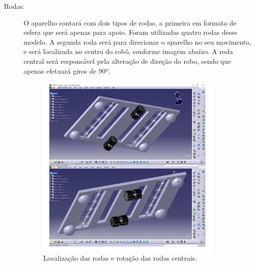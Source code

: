 \begin{description}
\item[Rodas:] O aparelho contará com dois tipos de rodas, a primeira em formato
de esfera que será apenas para apoio. Foram utilizadas quatro rodas desse modelo.
A segunda roda será para direcionar o aparelho no seu movimento, e será localizada
no centro do robô, conforme imagem abaixo. A roda central será responsável pela
alteração de direção do robo, sendo que apenas efetuará giros de  90º.
\par
\begin{figure}[h]
  \centering
  \includegraphics[width=0.9\textwidth]{figures/wheels.png}
  \caption{Localização das rodas e rotação das rodas centrais.}
  \label{fig:wheels}
\end{figure}
\FloatBarrier


\end{description}
